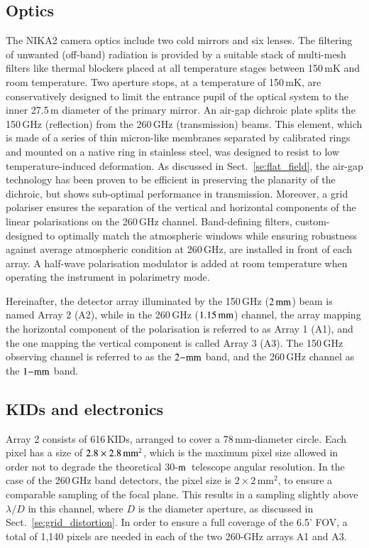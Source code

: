 \documentclass[traditionalabstract]{aa}
\newcommand{\trentemetre}{30-$\rm{m}$}
\newcommand{\lp}[1]{#1}
\newcommand{\rev}[1]{#1}
\begin{document}
\subsection{Optics}
\label{se:instru_optics}
The NIKA2 camera optics include two cold mirrors and six lenses. The
filtering of unwanted (off-band) radiation is provided by a suitable stack of
multi-mesh filters {\lp like thermal blockers} placed at all temperature
stages between 150\,mK and room temperature. {\lp Two aperture stops,
at a temperature of 150\,mK, are conservatively designed to limit the
entrance pupil of the optical system to the inner 27.5\,m diameter of
the primary mirror. }
An air-gap dichroic plate splits the 150\,GHz (reflection)
from the 260\,GHz (transmission) beams. {\lp This element, which is
made of a series of thin micron-like membranes separated by calibrated
rings and mounted on a native ring in stainless steel, was designed to
resist to low temperature-induced deformation.}
As discussed in Sect.~\ref{se:flat_field}, the air-gap technology has
been proven to be efficient in preserving the planarity of the dichroic, but shows sub-optimal
performance in transmission. Moreover, a grid polariser ensures the
separation of the vertical and horizontal components of the linear
polarisations on the 260\,GHz channel. Band-defining filters,
custom-designed to optimally match the atmospheric windows while
ensuring robustness against average atmospheric condition at 260\,GHz,
are installed in front of each array. A half-wave polarisation
modulator is added at room temperature when operating the instrument
in polarimetry mode.

Hereinafter, the detector array illuminated by the 150\,GHz
($2\, \rm{mm}$) beam is named Array 2 (A2), 
while in the 260\,GHz ($1.15\, \rm{mm}$) channel, the array mapping the
horizontal component of the polarisation is referred to as Array 1 (A1),
and the one mapping the vertical component is called Array 3 (A3). The
150\,GHz observing channel is referred to as the $2\rm{-mm}$ band,
and the 260\,GHz channel as the $1\rm{-mm}$ band. 

\subsection{KIDs and electronics}
\label{se:array}

Array 2 consists of 616\,KIDs, arranged to cover a 78\,mm-diameter
circle. Each pixel has a size of $2.8\times2.8\textrm{\,mm}^2$, which
is the maximum pixel size allowed in order not to degrade the theoretical
\trentemetre\ telescope angular resolution. In the
case of the 260\,GHz band detectors, the pixel size is $2\times
2\mathrm{\,mm}^2$, to ensure a comparable sampling of the focal
plane. {\rev This results in a sampling slightly above $\lambda/D$ in
this channel, where $D$ is the diameter aperture, as discussed in
Sect.~\ref{se:grid_distortion}.}
In order to ensure a full coverage of the 6.5' FOV, a total of
1,140 pixels are needed in each of the two 260-GHz arrays A1 and A3. 
\end{document}
